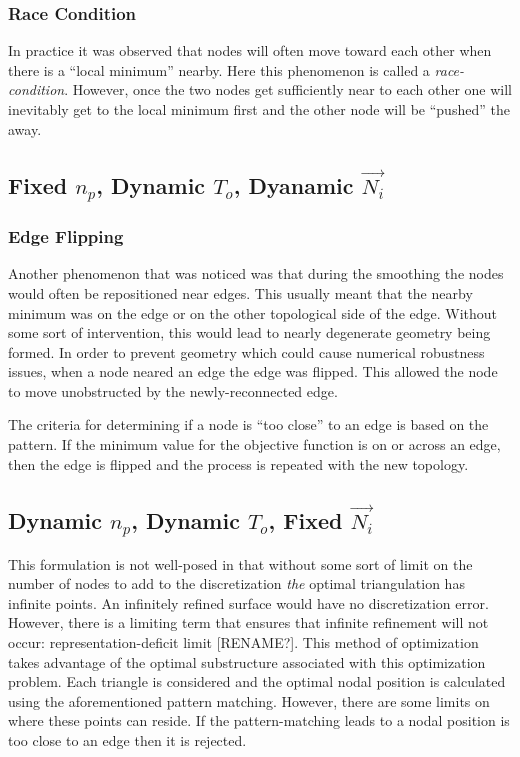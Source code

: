 \documentclass[11pt]{article}
\begin{document}
\subsubsection{Race Condition}
In practice it was observed that nodes will often move toward each other
when there is a ``local minimum'' nearby. Here this phenomenon is called
a {\it race-condition}. However, once the two nodes get sufficiently
near to each other one will inevitably get to the local minimum first
and the other node will be ``pushed'' the away.
\subsection{Fixed $n_p$, Dynamic $T_o$, Dyanamic $\vec{N_i}$}
\subsubsection{Edge Flipping}
Another phenomenon that was noticed was that during the smoothing the
nodes would often be repositioned near edges. This usually meant that
the nearby minimum was on the edge or on the other topological side of
the edge. Without some sort of intervention, this would lead to nearly
degenerate geometry being formed. In order to prevent geometry which
could cause numerical robustness issues, when a node neared an edge the
edge was flipped. This allowed the node to move unobstructed by the
newly-reconnected edge.

The criteria for determining if a node is ``too close'' to an edge is
based on the pattern. If the minimum value for the objective function is
on or across an edge, then the edge is flipped and the process is
repeated with the new topology.

\subsection{Dynamic $n_p$, Dynamic $T_o$, Fixed $\vec{N_i}$}
This formulation is not well-posed in that without some sort of limit on
the number of nodes to add to the discretization {\it the} optimal
triangulation has infinite points. An infinitely refined surface would
have no discretization error. However, there is a limiting term that
ensures that infinite refinement will not occur: representation-deficit
limit [RENAME?]. This method of optimization takes advantage of the
optimal substructure associated with this optimization problem. Each
triangle is considered and the optimal nodal position is calculated
using the aforementioned pattern matching. However, there are some
limits on where these points can reside. If the pattern-matching leads
to a nodal position is too close to an edge then it is rejected.
\end{document}
